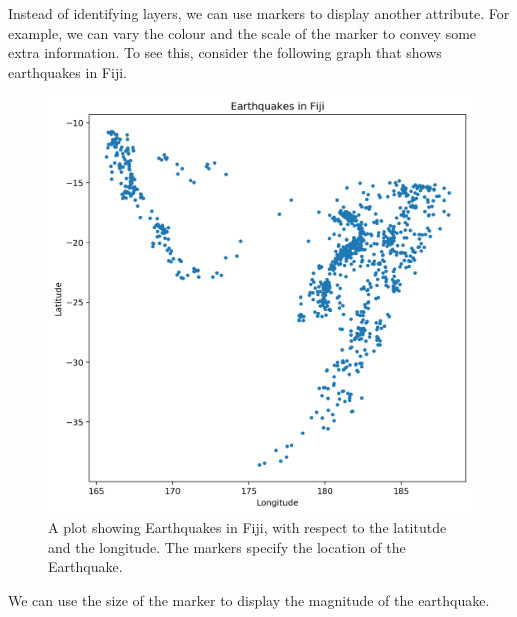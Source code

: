 \documentclass[a4paper, openany]{memoir}
\begin{document}
Instead of identifying layers, we can use markers to display another attribute. For example, we can vary the colour and the scale of the marker to convey some extra information. To see this, consider the following graph that shows earthquakes in Fiji.
\begin{figure}[H]
    \centering
    \includegraphics[scale=0.4]{src/2.40 Fiji Example Plot 1.png}
    \caption{A plot showing Earthquakes in Fiji, with respect to the latitutde and the longitude. The markers specify the location of the Earthquake.}
\end{figure}
\noindent We can use the size of the marker to display the magnitude of the earthquake.
\end{document}
